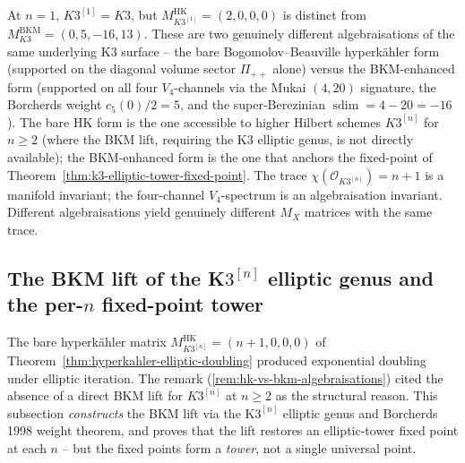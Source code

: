 \begin{remark}
\label{rem:hk-vs-bkm-algebraisations}
At $n = 1$, $K3^{[1]} = K3$, but
$M_{K3^{[1]}}^{\mathrm{HK}} = (2, 0, 0, 0)$ is distinct from
$M_{K3}^{\mathrm{BKM}} = (0, 5, -16, 13)$. These are two genuinely
different algebraisations of the same underlying K$3$ surface -- the
bare Bogomolov--Beauville hyperk\"ahler form
\textup{(}supported on the diagonal volume sector
$\Pi_{++}$ alone\textup{)} versus the BKM-enhanced form
\textup{(}supported on all four $V_4$-channels via the Mukai $(4, 20)$
signature, the Borcherds weight $c_5(0)/2 = 5$, and the
super-Berezinian $\operatorname{sdim} = 4 - 20 = -16$\textup{).} The
bare HK form is the one accessible to higher Hilbert schemes
$K3^{[n]}$ for $n \geq 2$
\textup{(}where the BKM lift, requiring the K$3$ elliptic genus, is
not directly available\textup{);} the BKM-enhanced form is the one
that anchors the fixed-point of
Theorem~\ref{thm:k3-elliptic-tower-fixed-point}. The trace
$\chi(\mathcal{O}_{K3^{[n]}}) = n + 1$ is a manifold invariant;
the four-channel $V_4$-spectrum is an algebraisation invariant. Different algebraisations yield genuinely
different $M_X$ matrices with the same trace.
\end{remark}

\subsection{The BKM lift of the K\texorpdfstring{$3^{[n]}$}{3-[n]} elliptic genus and the
 per-\texorpdfstring{$n$}{n} fixed-point tower}
\label{subsec:hyperkahler-bkm-lift-tower}

The bare hyperk\"ahler matrix $M^{\mathrm{HK}}_{K3^{[n]}} = (n + 1, 0, 0, 0)$
of Theorem~\ref{thm:hyperkahler-elliptic-doubling} produced exponential
doubling under elliptic iteration. The remark
\textup{(}\ref{rem:hk-vs-bkm-algebraisations}\textup{)} cited
the absence of a direct BKM lift for $K3^{[n]}$ at $n \geq 2$ as the
structural reason. This subsection \emph{constructs} the BKM lift via
the K$3^{[n]}$ elliptic genus and Borcherds 1998 weight theorem, and
proves that the lift restores an elliptic-tower fixed point at each
$n$ -- but the fixed points form a \emph{tower}, not a single
universal point.

